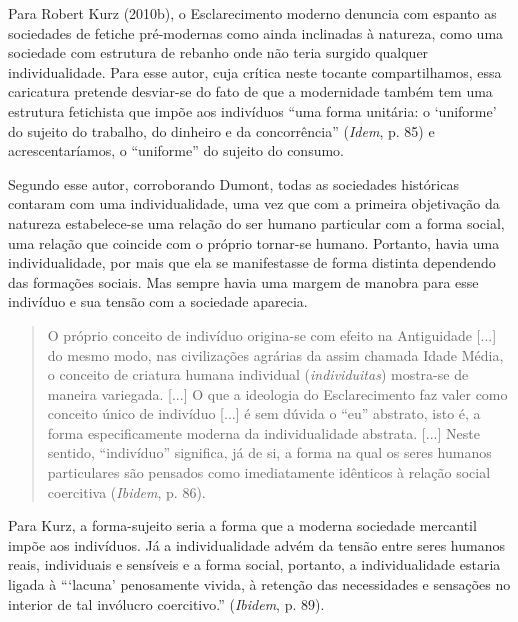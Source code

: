 Para Robert Kurz (2010b), o Esclarecimento moderno denuncia com espanto
as sociedades de fetiche pré-modernas como ainda inclinadas à natureza,
como uma sociedade com estrutura de rebanho onde não teria surgido
qualquer individualidade. Para esse autor, cuja crítica neste tocante
compartilhamos, essa caricatura pretende desviar-se do fato de que a
modernidade também tem uma estrutura fetichista que impõe aos indivíduos
``uma forma unitária: o `uniforme' do sujeito do trabalho, do dinheiro e
da concorrência'' (\emph{Idem}, p. 85) e acrescentaríamos, o
``uniforme'' do sujeito do consumo.

Segundo esse autor, corroborando Dumont, todas as sociedades históricas
contaram com uma individualidade, uma vez que com a primeira objetivação
da natureza estabelece-se uma relação do ser humano particular com a
forma social, uma relação que coincide com o próprio tornar-se humano.
Portanto, havia uma individualidade, por mais que ela se manifestasse de
forma distinta dependendo das formações sociais. Mas sempre havia uma
margem de manobra para esse indivíduo e sua tensão com a sociedade
aparecia.

\begin{quote}
O próprio conceito de indivíduo origina-se com efeito na Antiguidade
{[}...{]} do mesmo modo, nas civilizações agrárias da assim chamada
Idade Média, o conceito de criatura humana individual
(\emph{individuitas}) mostra-se de maneira variegada. {[}...{]} O que a
ideologia do Esclarecimento faz valer como conceito único de indivíduo
{[}...{]} é sem dúvida o ``eu'' abstrato, isto é, a forma
especificamente moderna da individualidade abstrata. {[}...{]} Neste
sentido, ``indivíduo'' significa, já de si, a forma na qual os seres
humanos particulares são pensados como imediatamente idênticos à relação
social coercitiva (\emph{Ibidem}, p. 86).
\end{quote}

Para Kurz, a forma-sujeito seria a forma que a moderna sociedade
mercantil impõe aos indivíduos. Já a individualidade advém da tensão
entre seres humanos reais, individuais e sensíveis e a forma social,
portanto, a individualidade estaria ligada à ```lacuna' penosamente
vivida, à retenção das necessidades e sensações no interior de tal
invólucro coercitivo.'' (\emph{Ibidem}, p. 89).

